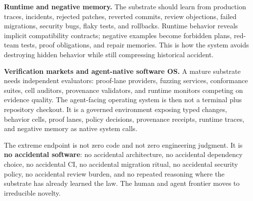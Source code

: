 \textbf{Runtime and negative memory.} The substrate should learn from production traces, incidents, rejected patches, reverted commits, review objections, failed migrations, security bugs, flaky tests, and rollbacks. Runtime behavior reveals implicit compatibility contracts; negative examples become forbidden plans, red-team tests, proof obligations, and repair memories. This is how the system avoids destroying hidden behavior while still compressing historical accident.

\textbf{Verification markets and agent-native software OS.} A mature substrate needs independent evaluators: proof-lane providers, fuzzing services, conformance suites, cell auditors, provenance validators, and runtime monitors competing on evidence quality. The agent-facing operating system is then not a terminal plus repository checkout. It is a governed environment exposing typed changes, behavior cells, proof lanes, policy decisions, provenance receipts, runtime traces, and negative memory as native system calls.

The extreme endpoint is not zero code and not zero engineering judgment. It is \textbf{no accidental software}: no accidental architecture, no accidental dependency choice, no accidental CI, no accidental migration ritual, no accidental security policy, no accidental review burden, and no repeated reasoning where the substrate has already learned the law. The human and agent frontier moves to irreducible novelty.


